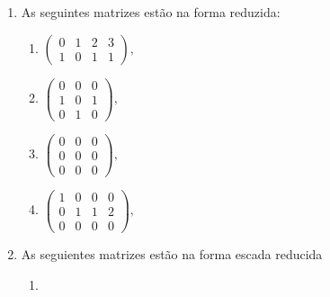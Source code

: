 \begin{example}
  \begin{enumerate}
    \item As seguintes matrizes estão na forma reduzida:
          \begin{enumerate}
            \item
                  \begin{math}
                    \begin{pmatrix}
                      0 & 1 & 2 & 3 \\
                      1 & 0 & 1 & 1
                    \end{pmatrix},
                  \end{math}
            \item

                  \begin{math}
                    \begin{pmatrix}
                      0 & 0 & 0 \\
                      1 & 0 & 1 \\
                      0 & 1 & 0
                    \end{pmatrix},
                  \end{math}

            \item

                  \begin{math}
                    \begin{pmatrix}
                      0 & 0 & 0 \\
                      0 & 0 & 0 \\
                      0 & 0 & 0
                    \end{pmatrix},
                  \end{math}

            \item

                  \begin{math}
                    \begin{pmatrix}
                      1 & 0 & 0 & 0 \\
                      0 & 1 & 1 & 2 \\
                      0 & 0 & 0 & 0
                    \end{pmatrix},
                  \end{math}
          \end{enumerate}
    \item As seguientes matrizes estão na forma escada reducida
          \begin{enumerate}
            \item


\end{enumerate}
\end{enumerate}
\end{example}
